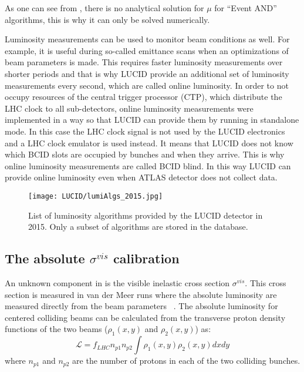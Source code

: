 As one can see from , there is no analytical solution for $\mu$ for ``Event AND'' algorithms, this is why it can only be solved numerically. 

Luminosity measurements can be used to monitor beam conditions as well.
For example, it is useful during so-called emittance scans when an optimizations of beam parameters is made.
This requires faster luminosity measurements over shorter periods and that is why LUCID provide an additional set of luminosity measurements every second, which are called online luminosity.
In order to not occupy resources of the central trigger processor (CTP), which distribute the LHC clock to all sub-detectors, 
online luminosity measurements were implemented in a way so that LUCID can provide them by running in standalone mode.
In this case the LHC clock signal is not used by the LUCID electronics and a LHC clock emulator is used instead.
It means that LUCID does not know which BCID slots are occupied by bunches and when they arrive.
This is why online luminosity measurements are called BCID blind.
In this way LUCID can provide online luminosity even when ATLAS detector does not collect data.

\begin{figure}
\centering
\texttt{[image: LUCID/lumiAlgs\_2015.jpg]}
\caption{List of luminosity algorithms provided by the LUCID detector in 2015. Only a subset of algorithms are stored in the database.}
\label{fig:InternalConsistency}
\end{figure}

\subsection{The absolute $\sigma^{vis}$ calibration}
\label{subsec:alfa_run}
An unknown component in  is the visible inelastic cross section $\sigma^{vis}$.
This cross section is measured in van der Meer runs where the absolute luminosity are measured directly from the beam parameters ~\cite{vanderMeer:296752,Rubbia:1025746}.
The absolute luminosity for centered colliding beams can be calculated from the transverse proton density functions of the two beams ($\rho_{1}(x,y)$ and $\rho_{2}(x,y)$) as:
\begin{equation}
\mathscr{L} = f_{LHC} n_{p1} n_{p2} \int \rho_{1}(x,y) \rho_{2}(x,y) dx dy
\label{eq:lumi_vs_intensity}
\end{equation}
where $n_{p1}$ and $n_{p2}$ are the number of protons in each of the two colliding bunches.


